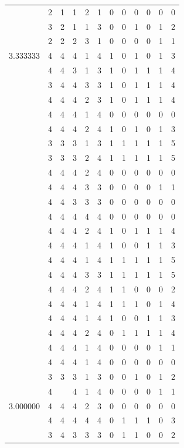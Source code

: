 \documentclass[]{book}
\theoremstyle{definition}
\theoremstyle{definition}
\theoremstyle{definition}
\theoremstyle{remark}
\begin{document}
\begin{table}
{\begin{tabular}[t]{rrrrrrrrrrrr}
 & 2 & 1 & 1 & 2 & 1 & 0 & 0 & 0 & 0 & 0 & 0\\
 & 3 & 2 & 1 & 1 & 3 & 0 & 0 & 1 & 0 & 1 & 2\\
 & 2 & 2 & 2 & 3 & 1 & 0 & 0 & 0 & 0 & 1 & 1\\
3.333333 & 4 & 4 & 4 & 1 & 4 & 1 & 0 & 1 & 0 & 1 & 3\\
 & 4 & 4 & 3 & 1 & 3 & 1 & 0 & 1 & 1 & 1 & 4\\
 & 3 & 4 & 4 & 3 & 3 & 1 & 0 & 1 & 1 & 1 & 4\\
 & 4 & 4 & 4 & 2 & 3 & 1 & 0 & 1 & 1 & 1 & 4\\
 & 4 & 4 & 4 & 1 & 4 & 0 & 0 & 0 & 0 & 0 & 0\\
 & 4 & 4 & 4 & 2 & 4 & 1 & 0 & 1 & 0 & 1 & 3\\
 & 3 & 3 & 3 & 1 & 3 & 1 & 1 & 1 & 1 & 1 & 5\\
 & 3 & 3 & 3 & 2 & 4 & 1 & 1 & 1 & 1 & 1 & 5\\
 & 4 & 4 & 4 & 2 & 4 & 0 & 0 & 0 & 0 & 0 & 0\\
 & 4 & 4 & 4 & 3 & 3 & 0 & 0 & 0 & 0 & 1 & 1\\
 & 4 & 4 & 3 & 3 & 3 & 0 & 0 & 0 & 0 & 0 & 0\\
 & 4 & 4 & 4 & 4 & 4 & 0 & 0 & 0 & 0 & 0 & 0\\
 & 4 & 4 & 4 & 2 & 4 & 1 & 0 & 1 & 1 & 1 & 4\\
 & 4 & 4 & 4 & 1 & 4 & 1 & 0 & 0 & 1 & 1 & 3\\
 & 4 & 4 & 4 & 1 & 4 & 1 & 1 & 1 & 1 & 1 & 5\\
 & 4 & 4 & 4 & 3 & 3 & 1 & 1 & 1 & 1 & 1 & 5\\
 & 4 & 4 & 4 & 2 & 4 & 1 & 1 & 0 & 0 & 0 & 2\\
 & 4 & 4 & 4 & 1 & 4 & 1 & 1 & 1 & 0 & 1 & 4\\
 & 4 & 4 & 4 & 1 & 4 & 1 & 0 & 0 & 1 & 1 & 3\\
 & 4 & 4 & 4 & 2 & 4 & 0 & 1 & 1 & 1 & 1 & 4\\
 & 4 & 4 & 4 & 1 & 4 & 0 & 0 & 0 & 0 & 1 & 1\\
 & 4 & 4 & 4 & 1 & 4 & 0 & 0 & 0 & 0 & 0 & 0\\
 & 3 & 3 & 3 & 1 & 3 & 0 & 0 & 1 & 0 & 1 & 2\\
 & 4 &  & 4 & 1 & 4 & 0 & 0 & 0 & 0 & 1 & 1\\
3.000000 & 4 & 4 & 4 & 2 & 3 & 0 & 0 & 0 & 0 & 0 & 0\\
 & 4 & 4 & 4 & 4 & 4 & 0 & 1 & 1 & 1 & 0 & 3\\
 & 3 & 4 & 3 & 3 & 3 & 0 & 1 & 1 & 0 & 0 & 2\\

\end{tabular}}
\end{table}
\end{document}
